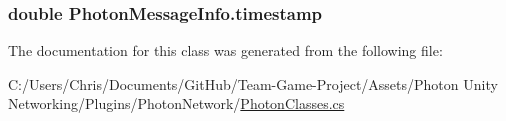 \subsubsection[{\texorpdfstring{timestamp}{timestamp}}]{\setlength{\rightskip}{0pt plus 5cm}double Photon\+Message\+Info.\+timestamp\hspace{0.3cm}{\ttfamily [get]}}\hypertarget{class_photon_message_info_a8a9879f9d95f99f4d066aba32d5853ca}{}\label{class_photon_message_info_a8a9879f9d95f99f4d066aba32d5853ca}


The documentation for this class was generated from the following file\+:\begin{DoxyCompactItemize}
\item 
C\+:/\+Users/\+Chris/\+Documents/\+Git\+Hub/\+Team-\/\+Game-\/\+Project/\+Assets/\+Photon Unity Networking/\+Plugins/\+Photon\+Network/\hyperlink{_photon_classes_8cs}{Photon\+Classes.\+cs}\end{DoxyCompactItemize}
